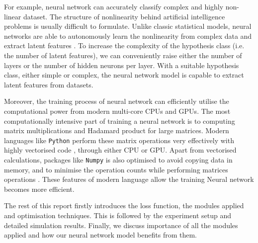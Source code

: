 
For example, neural network can accurately classify complex and highly non-linear dataset. The structure of nonlinearity behind artificial intelligence problems is usually difficult to formulate. Unlike classic statistical models, neural networks are able to autonomously learn the nonlinearity from complex data and extract latent features \citep{Bishop:2006:PRM:1162264}. To increase the complexity of the hypothesis class (i.e. the number of latent features), we can conveniently raise either the number of layers or the number of hidden neurons per layer.  
With a suitable hypothesis class, either simple or complex, the neural network model is capable to extract latent features from datasets.

Moreover, the training process of neural network can efficiently utilise the computational power from modern multi-core CPUs and GPUs. The most computationally intensive part of training a neural network is to computing matrix multiplications and Hadamard product for large matrices. Modern languages like \texttt{Python} perform these matrix operations very effectively with highly vectorised code \citep{5725236}, through either CPU or GPU. Apart from vectorised calculations, packages like \texttt{Numpy} is also optimised to avoid copying data in memory, and to minimise the operation counts while performing matrices operations \citep{5725236}. These features of modern language allow the training Neural network becomes more efficient.

The rest of this report firstly introduces the loss function, the modules applied and optimisation techniques. 
This is followed by the experiment setup and detailed simulation results.
Finally, we discuss importance of all the modules applied and how our neural network model benefits from them.
